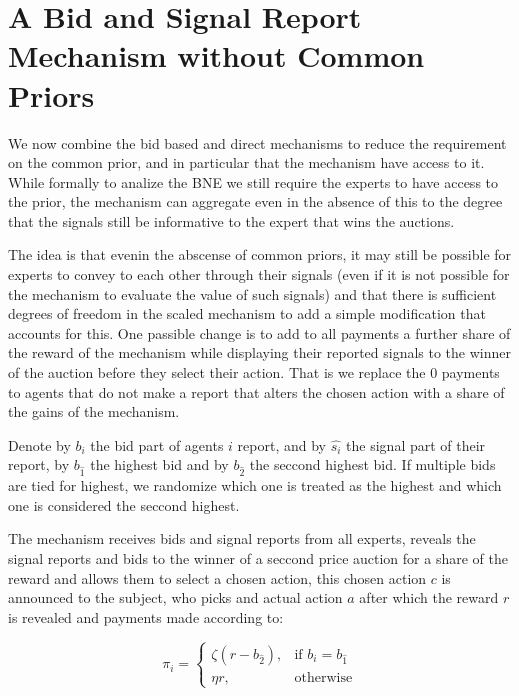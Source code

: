 




\section{A Bid and Signal Report Mechanism without Common Priors}

We now combine the bid based and direct mechanisms to reduce the requirement on the common prior, and in particular that the mechanism have access to it. While formally to analize the BNE we still require the experts to have access to the prior, the mechanism can aggregate even in the absence of this to the degree that the signals still be informative to the expert that wins the auctions. 

The idea is that evenin the abscense of common priors, it may still be possible for experts to convey to each other through their signals (even if it is not possible for the mechanism to evaluate the value of such signals) and that there is sufficient degrees of freedom in the scaled mechanism to add a simple modification that accounts for this.
One passible change is to add to all payments a further share of the reward of the mechanism while displaying their reported signals to the winner of the auction before they select their action. That is we replace the 0 payments to agents that do not make a report that alters the chosen action with a  share of the gains of the mechanism.

Denote by $b_i$ the bid part of agents $i$ report, and by $\hat{s_i}$ the signal part of their report, by $b_{\hat{1}}$ the highest bid and by $b_{\hat{2}}$ the seccond highest bid. If multiple bids are tied for highest, we  randomize which one is treated as the highest and which one is considered the seccond highest.

\begin{mech}
The mechanism receives bids and signal reports from all experts, reveals the signal reports and bids to the winner of a seccond price auction for a share of the reward and allows them to select a chosen action, this chosen action $c$ is announced to the subject, who picks and actual action $a$ after which the reward $r$ is revealed and payments made according to:


\[
    \pi_i = 
\begin{cases}
    \zeta (r - b_{\hat{2}} ) ,& \text{if } b_i = b_{\hat{1}}\\
    \eta r,              & \text{otherwise}
\end{cases}
\]

\end{mech}

